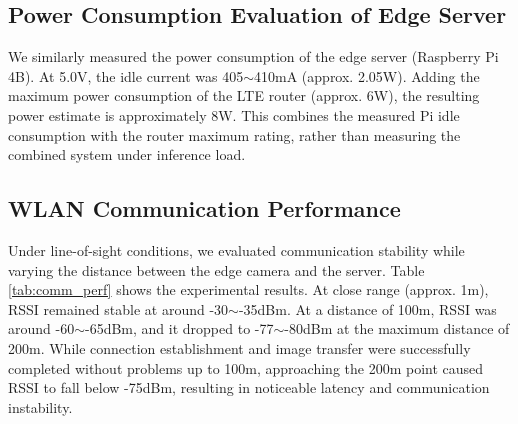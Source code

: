 \documentclass[conference]{IEEEtran}
\begin{document}
\subsection{Power Consumption Evaluation of Edge Server}
We similarly measured the power consumption of the edge server (Raspberry Pi 4B). At 5.0V, the idle current was 405$\sim$410mA (approx. 2.05W). Adding the maximum power consumption of the LTE router (approx. 6W), the resulting power estimate is approximately 8W. This combines the measured Pi idle consumption with the router maximum rating, rather than measuring the combined system under inference load.

\subsection{WLAN Communication Performance}
Under line-of-sight conditions, we evaluated communication stability while varying the distance between the edge camera and the server. Table \ref{tab:comm_perf} shows the experimental results. At close range (approx. 1m), RSSI remained stable at around -30$\sim$-35dBm. At a distance of 100m, RSSI was around -60$\sim$-65dBm, and it dropped to -77$\sim$-80dBm at the maximum distance of 200m. While connection establishment and image transfer were successfully completed without problems up to 100m, approaching the 200m point caused RSSI to fall below -75dBm, resulting in noticeable latency and communication instability.

\begin{table}[tb]
    \caption{Communication Performance (Line-of-Sight Environment)}
    \label{tab:comm_perf}
        \begin{center}\footnotesize
    \end{center}
    \end{table}
\end{document}
